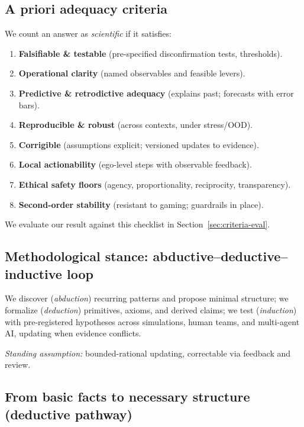 \documentclass[12pt]{article}
\begin{document}
\subsection{A priori adequacy criteria}
We count an answer as \emph{scientific} if it satisfies:
\begin{enumerate}
\item \textbf{Falsifiable \& testable} (pre-specified disconfirmation tests, thresholds).
\item \textbf{Operational clarity} (named observables and feasible levers).
\item \textbf{Predictive \& retrodictive adequacy} (explains past; forecasts with error bars).
\item \textbf{Reproducible \& robust} (across contexts, under stress/OOD).
\item \textbf{Corrigible} (assumptions explicit; versioned updates to evidence).
\item \textbf{Local actionability} (ego-level steps with observable feedback).
\item \textbf{Ethical safety floors} (agency, proportionality, reciprocity, transparency).
\item \textbf{Second-order stability} (resistant to gaming; guardrails in place).
\end{enumerate}
We evaluate our result against this checklist in Section~\ref{sec:criteria-eval}.

\subsection{Methodological stance: abductive--deductive--inductive loop}
We discover (\emph{abduction}) recurring patterns and propose minimal structure; we formalize (\emph{deduction}) primitives, axioms, and derived claims; we test (\emph{induction}) with pre-registered hypotheses across simulations, human teams, and multi-agent AI, updating when evidence conflicts.

\emph{Standing assumption:} bounded-rational updating, correctable via feedback and review.

\subsection{From basic facts to necessary structure (deductive pathway)}
\end{document}

